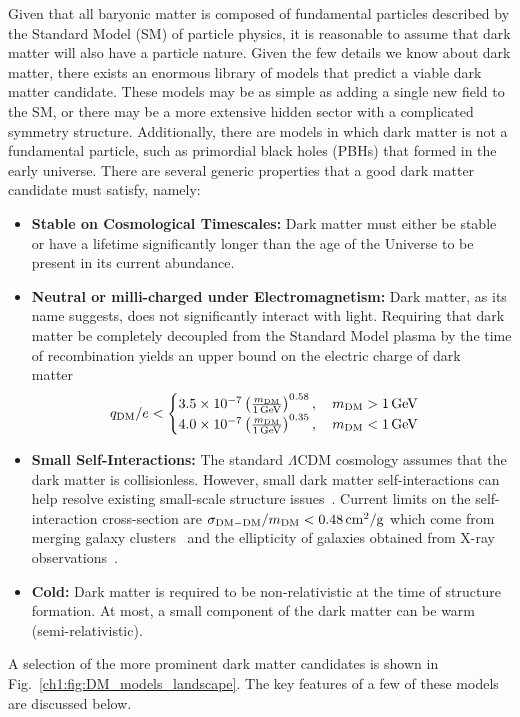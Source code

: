Given that all baryonic matter is composed of fundamental particles described by the Standard Model (SM) of particle physics, it is reasonable to assume that dark matter will also have a particle nature. Given the few details we know about dark matter, there exists an enormous library of models that predict a viable dark matter candidate.
These models may be as simple as adding a single new field to the SM, or there may be a more extensive hidden sector with a complicated symmetry structure. Additionally, there are models in which dark matter is not a fundamental particle, such as primordial black holes (PBHs) that formed in the early universe. There are several generic properties that a good dark matter candidate must satisfy, namely:

\begin{itemize}
    \item \textbf{Stable on Cosmological Timescales:} Dark matter must either be stable or have a lifetime significantly longer than the age of the Universe to be present in its current abundance. 
    
    \item \textbf{Neutral or milli-charged under Electromagnetism:} Dark matter, as its name suggests, does not significantly interact with light. Requiring that dark matter be completely decoupled from the Standard Model plasma by the time of recombination yields an upper bound on the electric charge of dark matter~\cite{McDermott:2010pa_TurningLightsHow} 
    \begin{equation}
        q_\mathrm{DM}/e < \begin{cases}
            3.5\times10^{-7} \left( \frac{m_\mathrm{DM}}{1{\rm \,GeV}}\right)^{0.58},\quad m_\mathrm{DM} > 1{\rm \,GeV}\\
            4.0\times 10^{-7}\left( \frac{m_\mathrm{DM}}{1{\rm \,GeV}}\right)^{0.35},\quad m_\mathrm{DM} <1{\rm \,GeV}
        \end{cases}
    \end{equation}
    
    \item \textbf{Small Self-Interactions:} The standard $\Lambda$CDM cosmology assumes that the dark matter is collisionless. However, small dark matter self-interactions can help resolve existing small-scale structure issues~\cite{Tulin:2017ara_feb_DarkMatterSelfinteractions, Spergel:1999mh_Observationalevidenceselfinteracting}. Current limits on the self-interaction cross-section are $\sigma_{\mathrm{DM-DM}}/m_\mathrm{DM} < 0.48{\rm \,cm}^2/\mathrm{g}$ which come from merging galaxy clusters~\cite{Randall:2008ppe_ConstraintsSelfInteractionCrossSection} and the ellipticity of galaxies obtained from X-ray observations~\cite{Buote:2002wd_ChandraEvidenceFlattened}.

    \item \textbf{Cold:} Dark matter is required to be non-relativistic at the time of structure formation. At most, a small component of the dark matter can be warm (semi-relativistic).
\end{itemize}
A selection of the more prominent dark matter candidates is shown in Fig.~\ref{ch1:fig:DM_models_landscape}. The key features of a few of these models are discussed below.

